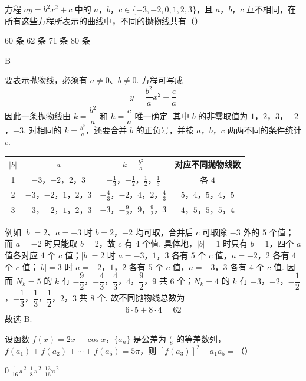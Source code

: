 \begin{problem}
方程 \(ay = b^2 x^2 + c\) 中的 \(a\)，\(b\)，\(c \in \{-3, -2, 0, 1, 2, 3\}\)，且 \(a\)，\(b\)，\(c\) 互不相同，在所有这些方程所表示的曲线中，不同的抛物线共有（\quad）

\choices
    {60 条}
    {62 条}
    {71 条}
    {80 条}
\end{problem}

\begin{answer}
B
\end{answer}

\begin{solution}
要表示抛物线，必须有 \(a\neq0\)、\(b\neq0\). 方程可写成
\[
y=\frac{b^2}{a}x^2+\frac ca
\]
因此一条抛物线由 \(k=\dfrac{b^2}{a}\) 和 \(h=\dfrac ca\) 唯一确定. 其中 \(b\) 的非零取值为 \(1\)，\(2\)，\(3\)，\(-2\)，\(-3\). 对相同的 \(k=\frac{b^2}{a}\)，还要合并 \(b\) 的正负号，并按 \(a\)，\(b\)，\(c\) 两两不同的条件统计 \(c\).

\begin{tabular}{c|c|c|c}
\(|b|\) & \(a\) & \(k=\frac{b^2}{a}\) & 对应不同抛物线数\\ \hline
1 & \(-3\)，\(-2\)，\(2\)，\(3\) & \(-\frac13\)，\(-\frac12\)，\(\frac12\)，\(\frac13\) & 各 \(4\)\\
2 & \(-3\)，\(-2\)，\(1\)，\(2\)，\(3\) & \(-\frac43\)，\(-2\)，\(4\)，\(2\)，\(\frac43\) & \(5\)，\(4\)，\(5\)，\(4\)，\(5\)\\
3 & \(-3\)，\(-2\)，\(1\)，\(2\)，\(3\) & \(-3\)，\(-\frac92\)，\(9\)，\(\frac92\)，\(3\) & \(4\)，\(5\)，\(5\)，\(5\)，\(4\)
\end{tabular}

例如 \(|b|=2\)、\(a=-3\) 时 \(b=2\)，\(-2\) 均可取，合并后 \(c\) 可取除 \(-3\) 外的 \(5\) 个值；而 \(a=-2\) 时只能取 \(b=2\)，故 \(c\) 有 \(4\) 个值. 具体地，\(|b|=1\) 时只有 \(b=1\)，四个 \(a\) 值各对应 \(4\) 个 \(c\) 值；\(|b|=2\) 时 \(a=-3\)，\(1\)，\(3\) 各有 \(5\) 个 \(c\) 值，\(a=-2\)，\(2\) 各有 \(4\) 个 \(c\) 值；\(|b|=3\) 时 \(a=-2\)，\(1\)，\(2\) 各有 \(5\) 个 \(c\) 值，\(a=-3\)，\(3\) 各有 \(4\) 个 \(c\) 值. 因而 \(N_k=5\) 的 \(k\) 有
\(-\dfrac92\)，\(-\dfrac43\)，\(\dfrac43\)，\(4\)，\(\dfrac92\)，\(9\) 共 \(6\) 个；\(N_k=4\) 的 \(k\) 有
\(-3\)，\(-2\)，\(-\dfrac12\)，\(-\dfrac13\)，\(\dfrac13\)，\(\dfrac12\)，\(2\)，\(3\) 共 \(8\) 个. 故不同抛物线总数为
\[
6\cdot5+8\cdot4=62
\]
故选 B.
\end{solution}

\begin{problem}
设函数 \( f(x) = 2x - \cos x \)，\( \{a_n\} \) 是公差为 \( \frac{\pi}{8} \) 的等差数列，\( f(a_1) + f(a_2) + \cdots + f(a_5) = 5\pi \)，则 \( \left[f(a_3)\right]^2 - a_1a_5 = \)（\quad）

\choices
    {0}
    {\(\frac{1}{16}\pi^2\)}
    {\(\frac{1}{8}\pi^2\)}
    {\(\frac{13}{16}\pi^2\)}
\end{problem}

